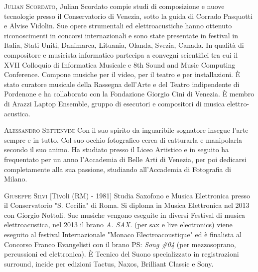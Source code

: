 \documentclass[9pt, twoside, a5paper]{extreport}
\newcommand{\biografia}[2]{%
\noindent \textsc{#1} %
#2 %
\medskip
}%
\begin{document}
\begin{multicols}{2}
\biografia{Julian Scordato,}{Julian Scordato compie studi di composizione e nuove tecnologie presso il Conservatorio di Venezia, sotto la guida di Corrado Pasquotti e Alvise Vidolin. Sue opere strumentali ed elettroacustiche hanno ottenuto riconoscimenti in concorsi internazionali e sono state presentate in festival in Italia, Stati Uniti, Danimarca, Lituania, Olanda, Svezia, Canada. In qualità di compositore e musicista informatico partecipa a convegni scientifici tra cui il XVII Colloquio di Informatica Musicale e 8th Sound and Music Computing Conference. Compone musiche per il video, per il teatro e per installazioni. È stato curatore musicale della Rassegna dell'Arte e del Teatro indipendente di Pordenone e ha collaborato con la Fondazione Giorgio Cini di Venezia. È membro di Arazzi Laptop Ensemble, gruppo di esecutori e compositori di musica elettro-acustica.}


\biografia{Alessandro Settenvini}{Con il suo spirito da inguaribile sognatore insegue l'arte sempre e in tutto. Col suo occhio fotografico cerca di catturarla e manipolarla secondo il suo animo. Ha studiato presso il Liceo Artistico e in seguito ha frequentato per un anno l'Accademia di Belle Arti di Venezia, per poi dedicarsi completamente alla sua passione, studiando all'Accademia di Fotografia di Milano.}

\biografia{Giuseppe Silvi}{[Tivoli (RM) - 1981] Studia Saxofono e Musica Elettronica presso il Conservatorio "S. Cecilia" di Roma. Si diploma in Musica Elettronica nel 2013 con Giorgio Nottoli. Sue musiche vengono eseguite in diversi Festival di musica elettroacustica, nel 2013 il brano \textit{A. SAX.} (per sax e live electronics) viene eseguito al festival Internazionale "Monaco Electroacoustique" ed è finalista al Concorso Franco Evangelisti con il brano PS: \textit{Song \#04} (per mezzosoprano, percussioni ed elettronica). È Tecnico del Suono specializzato in registrazioni surround, incide per edizioni Tactus, Naxos, Brilliant Classic e Sony.}


\end{multicols}
\end{document}
